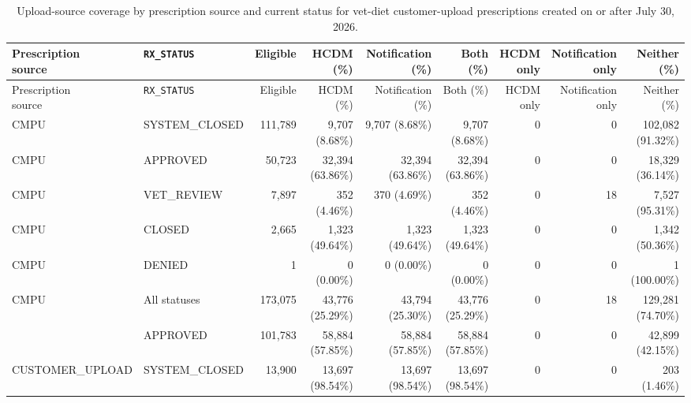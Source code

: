 \begin{longtable}{@{}llrrrrrrr@{}}
\caption{Upload-source coverage by prescription source and current status for vet-diet customer-upload prescriptions created on or after July 30, 2026.}
\label{tab:cmpu-approved-prescription-upload-coverage}\\
\toprule \shortstack[l]{Prescription\\source} & \texttt{RX\_STATUS} & Eligible & HCDM (\%) & Notification (\%) & Both (\%) & \shortstack{HCDM\\only} & \shortstack{Notification\\only} & Neither (\%) \\
\midrule
\endfirsthead
\toprule \shortstack[l]{Prescription\\source} & \texttt{RX\_STATUS} & Eligible & HCDM (\%) & Notification (\%) & Both (\%) & \shortstack{HCDM\\only} & \shortstack{Notification\\only} & Neither (\%) \\
\midrule
\endhead

{CMPU} & {SYSTEM\_CLOSED} & 111,789 & 9,707 (8.68\%) & 9,707 (8.68\%) & 9,707 (8.68\%) & 0 & 0 & 102,082 (91.32\%) \\

{CMPU} & {APPROVED} & 50,723 & 32,394 (63.86\%) & 32,394 (63.86\%) & 32,394 (63.86\%) & 0 & 0 & 18,329 (36.14\%) \\

{CMPU} & {VET\_REVIEW} & 7,897 & 352 (4.46\%) & 370 (4.69\%) & 352 (4.46\%) & 0 & 18 & 7,527 (95.31\%) \\

{CMPU} & {CLOSED} & 2,665 & 1,323 (49.64\%) & 1,323 (49.64\%) & 1,323 (49.64\%) & 0 & 0 & 1,342 (50.36\%) \\

{CMPU} & {DENIED} & 1 & 0 (0.00\%) & 0 (0.00\%) & 0 (0.00\%) & 0 & 0 & 1 (100.00\%) \\
\midrule
{CMPU} & {All statuses} & 173,075 & 43,776 (25.29\%) & 43,794 (25.30\%) & 43,776 (25.29\%) & 0 & 18 & 129,281 (74.70\%) \\
\addlinespace[2pt]
{CUSTOMER\_UPLOAD} & {APPROVED} & 101,783 & 58,884 (57.85\%) & 58,884 (57.85\%) & 58,884 (57.85\%) & 0 & 0 & 42,899 (42.15\%) \\

{CUSTOMER\_UPLOAD} & {SYSTEM\_CLOSED} & 13,900 & 13,697 (98.54\%) & 13,697 (98.54\%) & 13,697 (98.54\%) & 0 & 0 & 203 (1.46\%) \\


\end{longtable}
